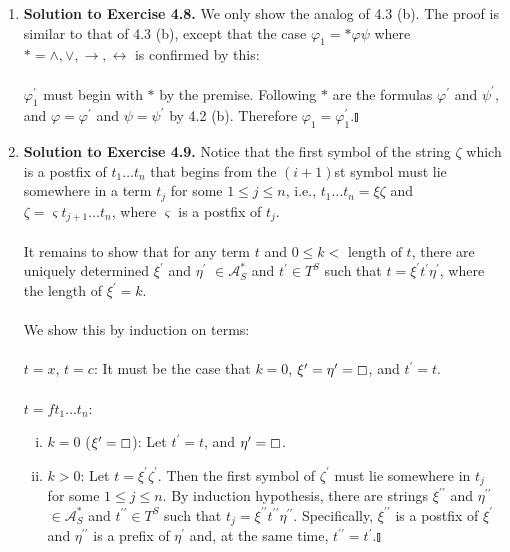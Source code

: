 \begin{enumerate}[1.]
\item \textbf{Solution to Exercise 4.8.} We only show the analog of 4.3 (b). The proof is similar to that of 4.3 (b), except that the case $\varphi_1 = \ast \varphi \psi$ where $\ast = \land, \lor, \rightarrow, \leftrightarrow$ is confirmed by this: \\
\ 
\\$\varphi_1^\prime$ must begin with $\ast$ by the premise. Following $\ast$ are the formulas $\varphi^\prime$ and $\psi^\prime$, and $\varphi = \varphi^\prime$ and $\psi = \psi^\prime$ by 4.2 (b). Therefore $\varphi_1 = \varphi_1^\prime$.\nolinebreak\hfill$\talloblong$
%
\item \textbf{Solution to Exercise 4.9.} Notice that the first symbol of the string $\zeta$ which is a postfix of $t_1 \ldots t_n$ that begins from the $(i+1)$st symbol must lie somewhere in a term $t_j$ for some $1 \leq j \leq n$, i.e., $t_1 \ldots t_n = \xi \zeta$ and $\zeta = \varsigma t_{j+1} \ldots t_n$, where $\varsigma$ is a postfix of $t_j$. \\
\ 
\\It remains to show that for any term $t$ and $0 \leq k < \mbox{ length of } t$, there are uniquely determined $\xi^\prime$ and $\eta^\prime$ $\in \mathcal{A}_S^*$ and $t^\prime \in T^S$ such that $t = \xi^\prime t^\prime \eta^\prime$, where the length of $\xi^\prime = k$. \\
\ 
\\We show this by induction on terms: \\
\ 
\\$t = x$, $t = c$: It must be the case that $k = 0$, $\xi^\prime = \eta^\prime = \boxempty$, and $t^\prime = t$.\\
\ 
\\$t = ft_1 \ldots t_n$:
\begin{enumerate}[(i)]
\item $k = 0$ ($\xi^\prime = \boxempty$): Let $t^\prime = t$, and $\eta^\prime = \boxempty$.
\item $k > 0$: Let $t = \xi^\prime \zeta^\prime$. Then the first symbol of $\zeta^\prime$ must lie somewhere in $t_j$ for some $1 \leq j \leq n$. By induction hypothesis, there are strings $\xi^{\prime \prime}$ and $\eta^{\prime \prime}$ $\in \mathcal{A}_S^*$ and $t^{\prime \prime} \in T^S$ such that $t_j = \xi^{\prime \prime} t^{\prime \prime} \eta^{\prime \prime}$. Specifically, $\xi^{\prime \prime}$ is a postfix of $\xi^\prime$ and $\eta^{\prime \prime}$ is a prefix of $\eta^\prime$ and, at the same time, $t^{\prime \prime} = t^\prime$.\nolinebreak\hfill$\talloblong$
\end{enumerate}


\end{enumerate}
